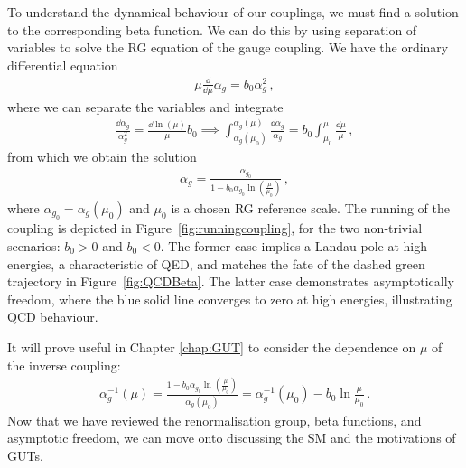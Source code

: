 To understand the dynamical behaviour of our couplings, we must find a solution to the corresponding beta function. We can do this by using separation of variables to solve the RG equation of the gauge coupling. We have the ordinary differential equation  
\begin{align}
    \mu\frac{\dd}{\dd\mu}\alpha_g=b_0\alpha_g^2\,,
\end{align}
where we can separate the variables and integrate
\begin{align}
    \frac{\dd\alpha_g}{\alpha_g^2}=\frac{\dd\ln(\mu)}{\mu}b_0\implies
    \int^{\alpha_g(\mu)}_{\alpha_g(\mu_0)}\frac{\dd\alpha_g}{\alpha_g}=b_0\int^{\mu}_{\mu_0}\frac{\dd\mu}{\mu}\,,
\end{align}
from which we obtain the solution  
\begin{align}
    \alpha_g=\frac{\alpha_{g_0}}{1-b_0 \alpha_{g_0} \ln \left(\frac{\mu}{\mu_0 }\right)}\,,
\end{align}
where $\alpha_{g_0}=\alpha_g(\mu_0)$ and $\mu_0$ is a chosen RG reference scale. The running of the coupling is depicted in Figure~\ref{fig:runningcoupling}, for the two non-trivial scenarios: $b_0>0$ and $b_0<0$. The former case implies a Landau pole at high energies, a characteristic of QED, and matches the fate of the dashed green trajectory in Figure~\ref{fig:QCDBeta}. The latter case demonstrates asymptotically freedom, where the blue solid line converges to zero at high energies, illustrating QCD behaviour.   

It will prove useful in Chapter \ref{chap:GUT} to consider the dependence on $\mu$ of the inverse coupling:
\begin{align}
    \alpha^{-1}_g(\mu)=\frac{1-b_0 \alpha_{g_0} \ln \left(\frac{\mu}{\mu_0 }\right)}{\alpha_{g}(\mu_0)}=\alpha_g^{-1}(\mu_0)-b_0\ln\frac{\mu}{\mu_0}\,.\label{eq:RGinversecoupling}
\end{align}
Now that we have reviewed the renormalisation group, beta functions, and asymptotic freedom, we can move onto discussing the SM and the motivations of GUTs. 
